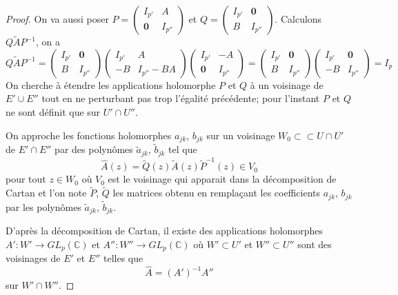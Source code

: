 \documentclass{article}
\theoremstyle{definition}
\theoremstyle{remark}
\begin{document}
\begin{proof}
On va aussi poser $P = \begin{pmatrix}
   I_{p'} & A \\
   \mathbf{0} & I_{p''} 
\end{pmatrix}$
et $Q = \begin{pmatrix}
   I_{p'} & \mathbf{0} \\
   B & I_{p''} 
\end{pmatrix}$. Calculons $Q\tilde{A}P^{-1}$, on a
\begin{equation*}
Q\tilde{A}P^{-1} = \begin{pmatrix}
   I_{p'} & \mathbf{0} \\
   B & I_{p''} 
\end{pmatrix}
\begin{pmatrix}
   I_{p'} & A \\
   -B & I_{p''} - BA 
\end{pmatrix}
\begin{pmatrix}
   I_{p'} & -A \\
   \mathbf{0} & I_{p''} 
\end{pmatrix} = \begin{pmatrix}
   I_{p'} & \mathbf{0} \\
   B & I_{p''} 
\end{pmatrix}\begin{pmatrix}
   I_{p'} & \mathbf{0} \\
   -B & I_{p''} 
\end{pmatrix} = I_p
\end{equation*}
On cherche à étendre les applications holomorphe $P$ et $Q$ à un voisinage de $E' \cup E''$ tout en ne perturbant pas trop l'égalité précédente; pour l'instant $P$ et $Q$ ne sont définit que sur $U' \cap U''$.

On approche les fonctions holomorphes $a_{jk}$, $b_{jk}$ sur un voisinage $W_0 \subset \subset U \cap U'$ de $E'\cap E''$ par des polynômes $\tilde{a}_{jk}$, $\tilde{b}_{jk}$ tel que $$\hat{A}(z) = \tilde{Q}(z)\tilde{A}(z)\tilde{P}^{-1}(z) \in V_0$$ pour tout $z \in W_0$ où $V_0$ est le voisinage qui apparait dans la décomposition de Cartan et l'on note $\tilde{P}$, $\tilde{Q}$ les matrices obtenu en remplaçant les coefficients $a_{jk}$, $b_{jk}$ par les polynômes $\tilde{a}_{jk}$, $\tilde{b}_{jk}$.

D'après la décomposition de Cartan, il existe des applications holomorphes $A' : W' \to GL_p(\mathbb{C})$ et $A'' : W'' \to GL_p(\mathbb{C})$ où $W' \subset U'$ et $W'' \subset U''$ sont des voisinages de $E'$ et $E''$ telles que $$\hat{A} = (A')^{-1}A''$$ sur $W' \cap W''$.


\end{proof}
\end{document}
